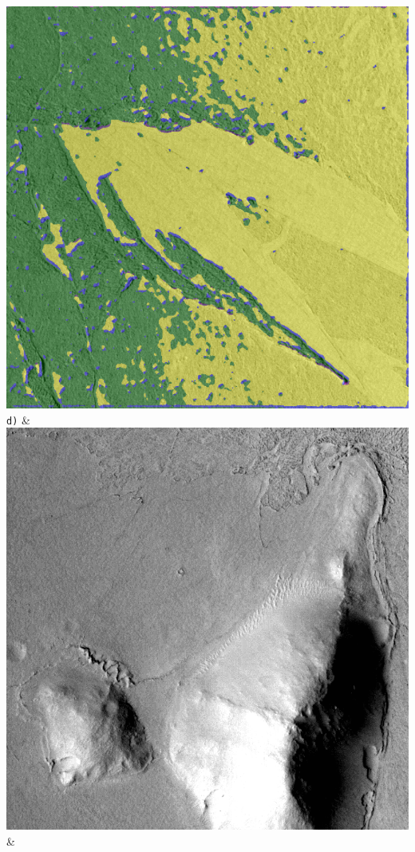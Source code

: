 \begin{table}[h!]
\begin{tabularx}{\textwidth}
		\includegraphics[width=0.9\linewidth]{images/gen/number_of_segments/p03_03.png_100.png} \\
		\texttt{d)} &
		\includegraphics[width=0.9\linewidth]{images/p03/p03_04.png} &

\end{tabularx}
\end{table}
